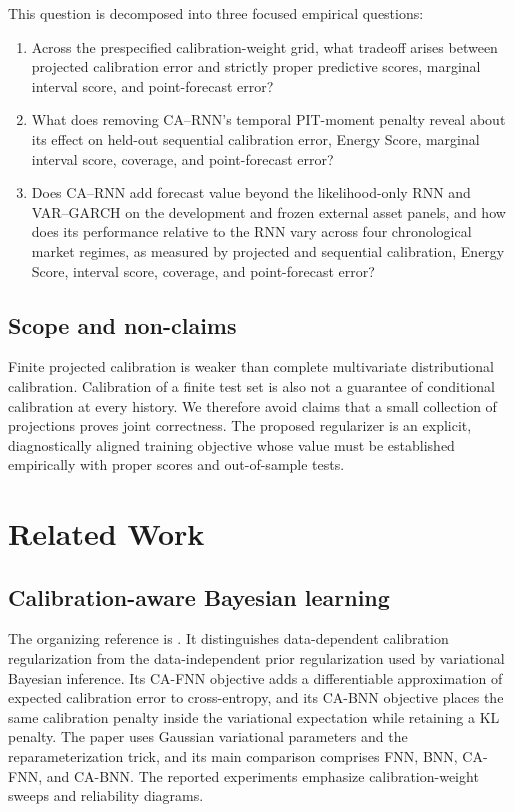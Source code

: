 \documentclass[11pt]{article}
\begin{document}
This question is decomposed into three focused empirical questions:
\begin{enumerate}[label=RQ\arabic*.]
    \item Across the prespecified calibration-weight grid, what tradeoff arises
    between projected calibration error and strictly proper predictive scores,
    marginal interval score, and point-forecast error?
    \item What does removing CA--RNN's temporal PIT-moment penalty reveal about
    its effect on held-out sequential calibration error, Energy Score, marginal
    interval score, coverage, and point-forecast error?
    \item Does CA--RNN add forecast value beyond the likelihood-only
    RNN and VAR--GARCH on the development and frozen external asset panels, and
    how does its performance relative to the RNN vary across four chronological
    market regimes, as measured by projected and sequential calibration, Energy
    Score, interval score, coverage, and point-forecast error?
\end{enumerate}

\subsection{Scope and non-claims}

Finite projected calibration is weaker than complete multivariate distributional
calibration. Calibration of a finite test set is also not a guarantee of
conditional calibration at every history. We therefore avoid claims
that a small collection of projections proves joint correctness. The proposed
regularizer is an explicit, diagnostically aligned training objective whose value
must be established empirically with proper scores and out-of-sample tests.

\section{Related Work}

\subsection{Calibration-aware Bayesian learning}

The organizing reference is \cite{huang2024cabl}. It distinguishes
data-dependent calibration regularization from the data-independent prior
regularization used by variational Bayesian inference. Its CA-FNN objective adds a
differentiable approximation of expected calibration error to cross-entropy, and
its CA-BNN objective places the same calibration penalty inside the variational
expectation while retaining a KL penalty. The paper uses Gaussian variational
parameters and the reparameterization trick, and its main comparison comprises
FNN, BNN, CA-FNN, and CA-BNN. The reported experiments emphasize calibration-weight
sweeps and reliability diagrams.
\end{document}
